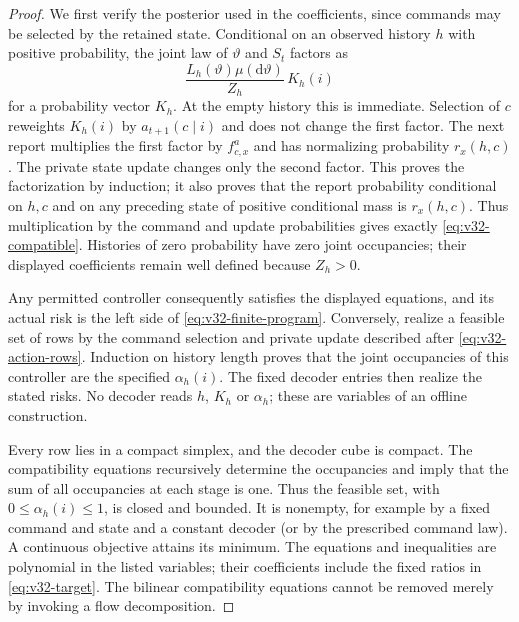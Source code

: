 \begin{proof}
We first verify the posterior used in the coefficients, since commands
may be selected by the retained state. Conditional on an observed history
$h$ with positive probability, the joint law of $\vartheta$ and $S_t$
factors as
\begin{equation}\label{eq:v32-posterior-factorization}
 \frac{L_h(\vartheta)\mu(\mathrm d\vartheta)}{Z_h}\,K_h(i)
\end{equation}
for a probability vector $K_h$. At the empty history this is immediate.
Selection of $c$ reweights $K_h(i)$ by $a_{t+1}(c\mid i)$ and does not
change the first factor. The next report multiplies the first factor by
$f^a_{c,x}$ and has normalizing probability $r_x(h,c)$. The private state
update changes only the second factor. This proves the factorization by
induction; it also proves that the report probability conditional on $h,c$
and on any preceding state of positive conditional mass is $r_x(h,c)$.
Thus multiplication by the command and update probabilities gives exactly
\eqref{eq:v32-compatible}. Histories of zero probability have zero joint
occupancies; their displayed coefficients remain well defined because
$Z_h>0$.

Any permitted controller consequently satisfies the displayed equations,
and its actual risk is the left side of
\eqref{eq:v32-finite-program}. Conversely, realize a feasible set of rows
by the command selection and private update described after
\eqref{eq:v32-action-rows}. Induction on history length proves that the
joint occupancies of this controller are the specified $\alpha_h(i)$.
The fixed decoder entries then realize the stated risks. No decoder reads
$h$, $K_h$ or $\alpha_h$; these are variables of an offline construction.

Every row lies in a compact simplex, and the decoder cube is compact.
The compatibility equations recursively determine the occupancies and
imply that the sum of all occupancies at each stage is one. Thus the
feasible set, with $0\le\alpha_h(i)\le1$, is closed and bounded.
It is nonempty, for example by a fixed command and state and a constant
decoder (or by the prescribed command law). A continuous objective attains
its minimum. The equations and inequalities are polynomial in the listed
variables; their coefficients include the fixed ratios in
\eqref{eq:v32-target}. The bilinear compatibility equations cannot be
removed merely by invoking a flow decomposition.
\end{proof}

